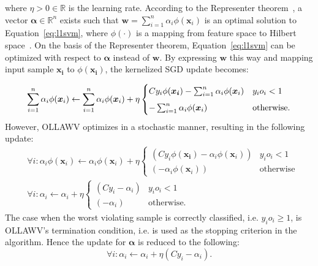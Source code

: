 \documentclass[reqno]{vcuthesis}
\newcommand{\reals}{{\mathbb{R}}}
\numberwithin{equation}{chapter}
\begin{document}
where $\eta > 0 \in \reals $ is the learning rate. According to the Representer theorem~\cite{scholkopf2001generalized}, a vector $\bm \alpha \in \reals^n$ exists such that $\bm w = \sum_{i=1}^n \alpha_i \phi(\bm x_i)$ is an optimal solution to Equation~\ref{eq:l1svm}, where $\phi(\cdot)$ is a mapping from feature space to Hilbert space~\cite{Shalev2014}. On the basis of the Representer theorem, Equation~\ref{eq:l1svm} can be optimized with respect to $\bm \alpha$ instead of $\bm w$. By expressing $\bm w$ this way and mapping input sample $\bm{x_i}$ to $\phi(\bm{x_i})$, the kernelized SGD update becomes:

\begin{equation*}
\centering
\sum_{i=1}^n \alpha_i \phi(\bm x_i) \leftarrow \sum_{i=1}^n \alpha_i \phi(\bm x_i) + \eta \begin{cases} 
															C y_i \phi(\bm{x_i}) - \sum_{i=1}^n \alpha_i \phi(\bm x_i) & y_i o_i < 1 \\[5pt]
															-\sum_{i=1}^n \alpha_i \phi(\bm x_i) & \text{otherwise}.
													 \end{cases}
\end{equation*}
However, OLLAWV optimizes in a stochastic manner, resulting in the following update:
\begin{align*}
&\forall i: \alpha_i \phi(\bm x_i) \leftarrow \alpha_i \phi(\bm x_i) + \eta \begin{cases} 
																													(Cy_i\phi(\bm{x_i}) - \alpha_i \phi(\bm x_i)) & y_i o_i < 1 \\
																													(- \alpha_i \phi(\bm x_i)) & \text{otherwise}
																													 \end{cases} \\							
&\forall i: \alpha_i \leftarrow \alpha_i + \eta \begin{cases} 
																(Cy_i - \alpha_i) & y_i o_i < 1 \\
																(- \alpha_i) & \text{otherwise}.
															\end{cases} 
\end{align*}
The case when the worst violating sample is correctly classified, i.e. $y_io_i \geq 1$, is OLLAWV's termination condition, i.e. is used as the stopping criterion in the algorithm. Hence the update for $\bm \alpha$ is reduced to the following:
\begin{equation}
\label{eq:alphaupdate}
\forall i: \alpha_i \leftarrow \alpha_i + \eta(Cy_i - \alpha_i).
\end{equation}
\end{document}

